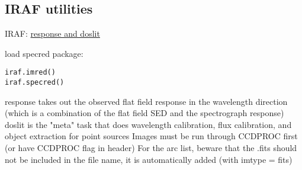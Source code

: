 \documentclass{article}
\begin{document}
\subsection*{IRAF utilities}
\begin{itemize*}
    \item IRAF: \href{http://iraf.noao.edu/iraf/web/tutorials/doslit/doslit.html}
        {response and doslit}
    \item load specred package:
        \begin{verbatim}
iraf.imred()
iraf.specred()
        \end{verbatim}
    \item response takes out the observed flat field response in the
        wavelength direction (which is a combination of the flat field
        SED and the spectrograph response)
        doslit is the "meta" task that does wavelength calibration,
        flux calibration, and object extraction for point sources
        Images must be run through CCDPROC first (or have CCDPROC flag
        in header)
        For the arc list, beware that the .fits should not be included
        in the file name, it is automatically added (with imtype =
        fits)
\end{itemize*}
\end{document}
